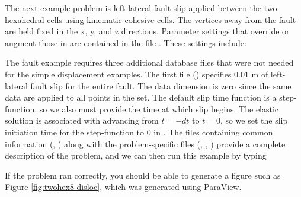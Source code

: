 The next example problem is left-lateral fault slip applied between
the two hexahedral cells using kinematic cohesive cells. The vertices
away from the fault are held fixed in the x, y, and z directions.
Parameter settings that override or augment those in 
are contained in the file . These settings
include:
\begin{inventory}
\end{inventory}
The fault example requires three additional database files that were
not needed for the simple displacement examples. The first file
() specifies 0.01 m of
left-lateral fault slip for the entire fault.  The data dimension is
zero since the same data are applied to all points in the set. The
default slip time function is a step-function, so we also must provide
the time at which slip begins. The elastic solution is associated with
advancing from $t=-dt$ to $t=0$, so we set the slip initiation time
for the step-function to 0 in
.  The files containing
common information (, )
along with the problem-specific files (,
,
) provide a complete
description of the problem, and we can then run this example by typing
If the problem ran correctly, you should be able to generate a figure
such as Figure \vref{fig:twohex8-disloc}, which was generated using
ParaView.

